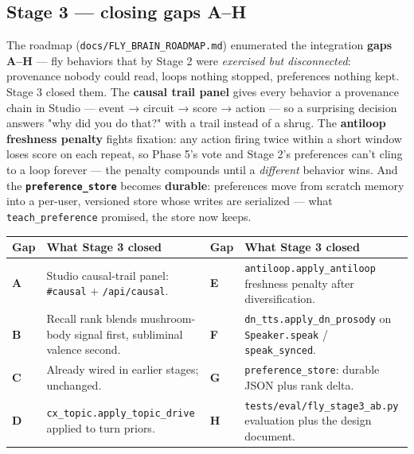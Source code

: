 \documentclass[11pt]{article}
\begin{document}
\subsection{Stage 3 — closing gaps A–H}

The roadmap (\texttt{docs/FLY\_BRAIN\_ROADMAP.md}) enumerated the integration \textbf{gaps A–H} — fly behaviors that by Stage 2 were \emph{exercised but disconnected}: provenance nobody could read, loops nothing stopped, preferences nothing kept. Stage 3 closed them. The \textbf{causal trail panel} gives every behavior a provenance chain in Studio — event → circuit → score → action — so a surprising decision answers "why did you do that?" with a trail instead of a shrug. The \textbf{antiloop freshness penalty} fights fixation: any action firing twice within a short window loses score on each repeat, so Phase 5's vote and Stage 2's preferences can't cling to a loop forever — the penalty compounds until a \emph{different} behavior wins. And the \textbf{\texttt{preference\_store}} becomes \textbf{durable}: preferences move from scratch memory into a per-user, versioned store whose writes are serialized — what \texttt{teach\_preference} promised, the store now keeps.

{\small
{}
\begin{longtable}{@{}>{\raggedright\arraybackslash}p{} >{\raggedright\arraybackslash}p{} >{\raggedright\arraybackslash}p{} >{\raggedright\arraybackslash}p{}@{}}
\toprule
\textbf{Gap} & \textbf{What Stage 3 closed} & \textbf{Gap} & \textbf{What Stage 3 closed} \\
\midrule
\textbf{A} & Studio causal-trail panel: \texttt{\#causal} + \texttt{/api/causal}. & \textbf{E} & \texttt{antiloop.apply\_antiloop} freshness penalty after diversification. \\
\textbf{B} & Recall rank blends mushroom-body signal first, subliminal valence second. & \textbf{F} & \texttt{dn\_tts.apply\_dn\_prosody} on \texttt{Speaker.speak} / \texttt{speak\_synced}. \\
\textbf{C} & Already wired in earlier stages; unchanged. & \textbf{G} & \texttt{preference\_store}: durable JSON plus rank delta. \\
\textbf{D} & \texttt{cx\_topic.apply\_topic\_drive} applied to turn priors. & \textbf{H} & \texttt{tests/eval/fly\_stage3\_ab.py} evaluation plus the design document. \\
\bottomrule
\end{longtable}
}
\end{document}
